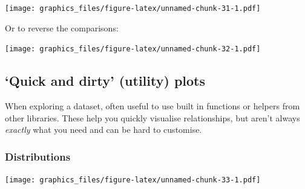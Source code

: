 \documentclass[]{article}
\newenvironment{Shaded}{\begin{snugshade}}{\end{snugshade}}
\newcommand{\KeywordTok}[1]{\textcolor[rgb]{0.13,0.29,0.53}{\textbf{#1}}}
\newcommand{\DataTypeTok}[1]{\textcolor[rgb]{0.13,0.29,0.53}{#1}}
\newcommand{\StringTok}[1]{\textcolor[rgb]{0.31,0.60,0.02}{#1}}
\newcommand{\OperatorTok}[1]{\textcolor[rgb]{0.81,0.36,0.00}{\textbf{#1}}}
\newcommand{\NormalTok}[1]{#1}
\theoremstyle{definition}
\theoremstyle{definition}
\theoremstyle{definition}
\theoremstyle{remark}
\begin{document}
\texttt{[image: graphics\_files/figure-latex/unnamed-chunk-31-1.pdf]}

Or to reverse the comparisons:

\begin{Shaded}
\end{Shaded}

\texttt{[image: graphics\_files/figure-latex/unnamed-chunk-32-1.pdf]}

\subsection*{\texorpdfstring{`Quick and dirty' (utility)
plots}{Quick and dirty (utility) plots}}\label{utility-plotting-functions}

When exploring a dataset, often useful to use built in functions or
helpers from other libraries. These help you quickly visualise
relationships, but aren't always \emph{exactly} what you need and can be
hard to customise.

\subsubsection{Distributions}\label{distributions-1}

\begin{Shaded}
\end{Shaded}

\texttt{[image: graphics\_files/figure-latex/unnamed-chunk-33-1.pdf]}

\begin{Shaded}
\end{Shaded}
\end{document}
